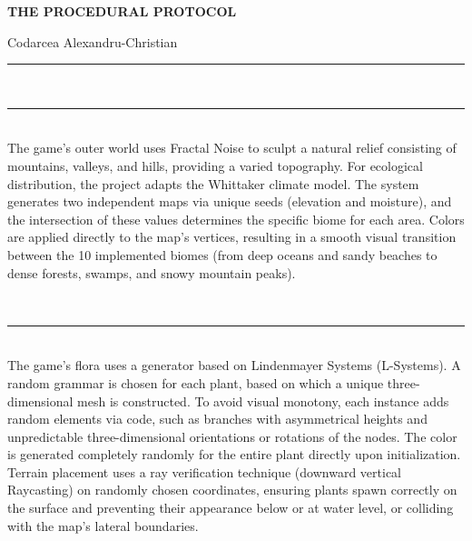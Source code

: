 \documentclass[11pt,a4paper]{article}
\begin{document}
\pagestyle{empty}

\begin{center}
    {\color{primary}\LARGE\bfseries THE PROCEDURAL PROTOCOL} \\[0.2cm]
\end{center}
\begin{flushright}
    {\color{textdark}\large Codarcea Alexandru-Christian} \\[0.1cm]
\end{flushright}
\rule{\textwidth}{1.5pt}
\vspace{0.3cm}

\vspace{0.3cm}
 \\
\rule{\textwidth}{0.8pt} \\
The game's outer world uses Fractal Noise to sculpt a natural relief consisting of mountains, valleys, and hills, providing a varied topography. For ecological distribution, the project adapts the Whittaker climate model. The system generates two independent maps via unique seeds (elevation and moisture), and the intersection of these values determines the specific biome for each area. Colors are applied directly to the map's vertices, resulting in a smooth visual transition between the 10 implemented biomes (from deep oceans and sandy beaches to dense forests, swamps, and snowy mountain peaks).

\vspace{0.4cm}
 \\
\rule{\textwidth}{0.8pt} \\
The game's flora uses a generator based on Lindenmayer Systems (L-Systems). A random grammar is chosen for each plant, based on which a unique three-dimensional mesh is constructed. To avoid visual monotony, each instance adds random elements via code, such as branches with asymmetrical heights and unpredictable three-dimensional orientations or rotations of the nodes. The color is generated completely randomly for the entire plant directly upon initialization. Terrain placement uses a ray verification technique (downward vertical Raycasting) on randomly chosen coordinates, ensuring plants spawn correctly on the surface and preventing their appearance below or at water level, or colliding with the map's lateral boundaries.
\end{document}
